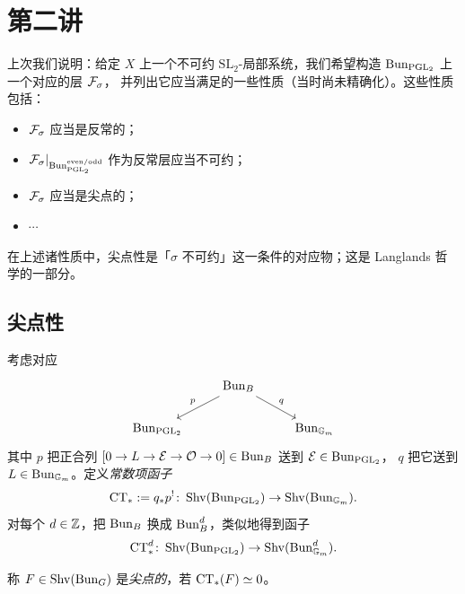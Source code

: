\section{第二讲}

上次我们说明：给定 \(X\) 上一个不可约 \(\mathrm{SL}_2\)-局部系统，我们希望构造 \(\operatorname{Bun}_{\mathrm{PGL}_2}\) 上一个对应的层 \(\mathcal{F}_\sigma\)，
并列出它应当满足的一些性质（当时尚未精确化）。这些性质包括：

\begin{itemize}
\item \(\mathcal{F}_\sigma\) 应当是反常的；
\item \(\mathcal{F}_\sigma|_{\operatorname{Bun}^{\mathrm{even}/\mathrm{odd}}_{\mathrm{PGL}_2}}\) 作为反常层应当不可约；
\item \(\mathcal{F}_\sigma\) 应当是尖点的；
\item \(\cdots\)
\end{itemize}

在上述诸性质中，尖点性是「\(\sigma\) 不可约」这一条件的对应物；这是 Langlands 哲学的一部分。

\subsection{尖点性}

\begin{definition}\label{def:ct}
考虑对应
\[
\begin{tikzcd}
& \Bun_B \arrow[dl,"p"'] \arrow[dr,"q"] & \\
\Bun_{\mathrm{PGL}_2} & & \Bun_{\Gm}
\end{tikzcd}
\]
其中 \(p\) 把正合列 \([0\to L\to\mathcal{E}\to\mathcal{O}\to 0]\in\operatorname{Bun}_B\) 送到 \(\mathcal{E}\in\operatorname{Bun}_{\mathrm{PGL}_2}\)，
\(q\) 把它送到 \(L\in\operatorname{Bun}_{\mathbb{G}_m}\)。定义\emph{常数项函子}
\[
\operatorname{CT}_*:=q_*p^!\colon\operatorname{Shv}(\operatorname{Bun}_{\mathrm{PGL}_2})\to\operatorname{Shv}(\operatorname{Bun}_{\mathbb{G}_m}).
\]
对每个 \(d\in\mathbb{Z}\)，把 \(\operatorname{Bun}_B\) 换成 \(\operatorname{Bun}^d_B\)，类似地得到函子
\[
\operatorname{CT}^d_*\colon\operatorname{Shv}(\operatorname{Bun}_{\mathrm{PGL}_2})\to\operatorname{Shv}(\operatorname{Bun}^d_{\mathbb{G}_m}).
\]
\end{definition}

\begin{definition}\label{def:cuspidal}
称 \(F\in\operatorname{Shv}(\operatorname{Bun}_G)\) 是\emph{尖点的}，若 \(\operatorname{CT}_*(F)\simeq 0\)。
\end{definition}

